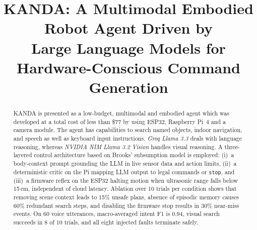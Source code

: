\documentclass[conference]{IEEEtran}
\newcommand{\safe}{\texttt{stop}}
\newcommand{\groq}{\textit{Groq Llama 3.3}}
\newcommand{\nvidia}{\textit{NVIDIA NIM Llama 3.2 Vision}}
\begin{document}
\title{KANDA: A Multimodal Embodied Robot Agent Driven by\\Large Language Models for Hardware-Conscious Command Generation}

\author{%
\and
{}
}

\maketitle

\begin{abstract}
KANDA is presented as a low-budget, multimodal and embodied agent which was developed at a total cost of less than \$77 by using ESP32, Raspberry Pi~4 and a camera module. The agent has capabilities to search named objects, indoor navigation, and speech as well as keyboard input instructions. \groq{} deals with language reasoning, whereas \nvidia{} handles visual reasoning. A three-layered control architecture based on Brooks' subsumption model is employed: (i)~a body-context prompt grounding the LLM in live sensor data and action limits, (ii)~a deterministic critic on the Pi mapping LLM output to legal commands or \safe{}, and (iii)~a firmware reflex on the ESP32 halting motion when ultrasonic range falls below 15\,cm, independent of cloud latency. Ablation over 10 trials per condition shows that removing scene context leads to 15\% unsafe plans, absence of episodic memory causes 60\% redundant search steps, and disabling the firmware stop results in 30\% near-miss events. On 60 voice utterances, macro-averaged intent F1 is 0.94, visual search succeeds in 8 of 10 trials, and all eight injected faults terminate safely.
\end{abstract}
\end{document}
